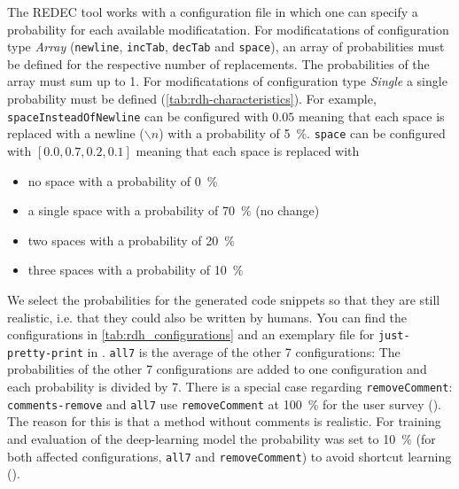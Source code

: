 \documentclass[%
class=scrreprt,
chapterprefix=false,%
open=right,%
twoside=false,%
paper=a4,%
logofile={Logo\_zentral\_farbig\_EN.png},%
thesistype=master,%
UKenglish,%
]{se2thesis}
\theoremstyle{definition}
\newcommand{\mod}{modificatation\xspace}
\newcommand{\mods}{modificatations\xspace}
\newcommand{\RDH}{Readability Decreaser\xspace}
\newcommand{\rdh}{REDEC\xspace}
\newcommand{\RDHa}{\RDH (\rdh)\xspace} %
\newcommand{\none}{just-pretty-print\xspace} %
\newcommand{\nonet}{\texttt{\none}\xspace} %
\begin{document}
	
	The \rdh tool works with a configuration file in which one can specify a probability for each available \mod.
	For \mods of configuration type \textit{Array} (\texttt{newline}, \texttt{incTab}, \texttt{decTab} and \texttt{space}), an array of probabilities must be defined for the respective number of replacements. The probabilities of the array must sum up to 1.
	For \mods of configuration type \textit{Single} a single probability must be defined (\autoref{tab:rdh-characteristics}).
	For example, \texttt{spaceInsteadOfNewline} can be configured with $0.05$ meaning that each space is replaced with a newline ($\backslash n$) with a probability of 5~\%.
	\texttt{space} can be configured with $[0.0, 0.7, 0.2, 0.1]$ meaning that each space is replaced with
	\begin{itemize}
		\item no space with a probability of 0~\%
		\item a single space with a probability of 70~\% (no change)
		\item two spaces with a probability of 20~\%
		\item three spaces with a probability of 10~\% 
	\end{itemize}
		
	We select the probabilities for the generated code snippets so that they are still realistic, i.e. that they could also be written by humans. You can find the configurations in \autoref{tab:rdh_configurations} and an exemplary file for \nonet in .
	\texttt{all7} is the average of the other 7 configurations: The probabilities of the other 7 configurations are added to one configuration and each probability is divided by 7.
	There is a special case regarding \texttt{removeComment}: \texttt{comments-remove} and \texttt{all7} use \texttt{removeComment} at 100~\% for the user survey (). The reason for this is that a method without comments is realistic. For training and evaluation of the deep-learning model the probability was set to 10~\% (for both affected configurations, \texttt{all7} and \texttt{removeComment}) to avoid shortcut learning ().
	
\end{document}
